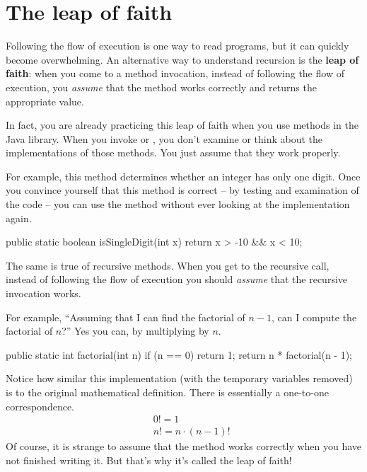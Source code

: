 \section{The leap of faith}
\label{leap_of_faith}


Following the flow of execution is one way to read programs, but it can quickly become overwhelming.
An alternative way to understand recursion is the {\bf leap of faith}:
when you come to a method invocation, instead of following the flow of execution, you {\em assume} that the method works correctly and returns the appropriate value.

In fact, you are already practicing this leap of faith when you use methods in the Java library.
When you invoke  or , you don't examine or think about the implementations of those methods.
You just assume that they work properly.

For example, this method determines whether an integer has only one digit.
Once you convince yourself that this method is correct -- by testing and examination of the code -- you can use the method without ever looking at the implementation again.

\begin{code}
public static boolean isSingleDigit(int x) {
    return x > -10 && x < 10;
}
\end{code}

The same is true of recursive methods.
When you get to the recursive call, instead of following the flow of execution you should {\em assume} that the recursive invocation works.

For example, ``Assuming that I can find the factorial of $n-1$, can I compute the factorial of $n$?''
Yes you can, by multiplying by $n$.

\begin{code}
public static int factorial(int n) {
    if (n == 0) {
        return 1;
    }
    return n * factorial(n - 1);
}
\end{code}

Notice how similar this implementation (with the temporary variables removed) is to the original mathematical definition.
There is essentially a one-to-one correspondence.
%
\begin{eqnarray*}
&&  0! = 1 \\
&&  n! = n \cdot(n-1)!
\end{eqnarray*}
%
Of course, it is strange to assume that the method works correctly when you have not finished writing it.
But that's why it's called the leap of faith!


